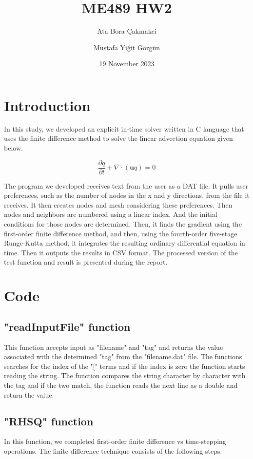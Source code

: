 \documentclass{report}
\title{ME489 HW2}
\author{Ata Bora Çakmakci}
\author{Mustafa Yiğit Görgün}
\affil{Middle East Technical University}
\date{19 November 2023}
\begin{document}
\maketitle
\tableofcontents

\chapter{Introduction}
In this study, we developed an explicit in-time solver written in C language that uses the finite difference method to solve the linear advection equation given below.

\begin{equation}
\frac{\partial q}{\partial t} + \nabla \cdot(\mathbf{u} q) = 0
\end{equation}

The program we developed receives text from the user as a DAT file. It pulls user preferences, such as the number of nodes in the x and y directions, from the file it receives. It then creates nodes and mesh considering these preferences. Then nodes and neighbors are numbered using a linear index. And the initial conditions for those nodes are determined. Then, it finds the gradient using the first-order finite difference method, and then, using the fourth-order five-stage Runge-Kutta method, it integrates the resulting ordinary differential equation in time. Then it outputs the results in CSV format. The processed version of the test function and result is presented during the report.

\chapter{Code}
\section{"readInputFile" function}
This function accepts input as "filename" and "tag" and returns the value associated with the determined "tag" from the "filename.dat" file. The functions searches for the index of the "[" terms and if the index is zero the function starts reading the string. The function compares the string character by character with the tag and if the two match, the function reads the next line as a double and return the value.
\section{"RHSQ" function}
In this function, we completed first-order finite difference vs time-stepping operations. The finite difference technique consists of the following steps:
\end{document}
